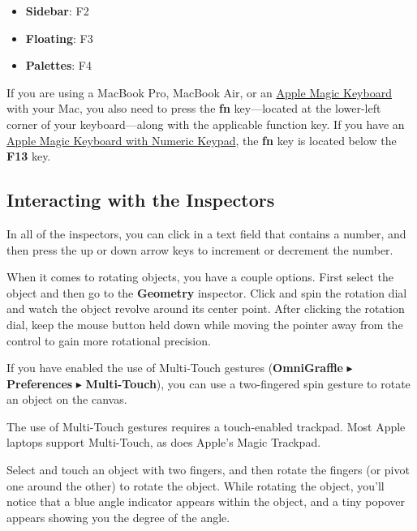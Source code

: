 \documentclass[../main.tex]{subfiles}
\begin{document}
\begin{itemize}
  \item \textbf{Sidebar}: F2
  \item \textbf{Floating}: F3
  \item \textbf{Palettes}: F4
\end{itemize}

\begin{ognote}
  If you are using a MacBook Pro, MacBook Air, or an
  \href{https://www.apple.com/shop/product/MLA22LL/A/magic-keyboard-us-english}{Apple Magic
  Keyboard} with your Mac, you also need to press the \textbf{fn} key---located at the
  lower-left corner of your keyboard---along with the applicable function key. If you have an
  \href{https://www.apple.com/shop/product/MQ052LL/A/magic-keyboard-with-numeric-keypad-us-english}{Apple
  Magic Keyboard with Numeric Keypad}, the \textbf{fn} key is located below the \textbf{F13}
  key.
\end{ognote}

\subsection{Interacting with the Inspectors}

In all of the inspectors, you can click in a text field that contains a number, and then press
the up or down arrow keys to increment or decrement the number.

When it comes to rotating objects, you have a couple options. First select the object and then
go to the \textbf{Geometry} inspector. Click and spin the rotation dial and watch the object
revolve around its center point. After clicking the rotation dial, keep the mouse button held
down while moving the pointer away from the control to gain more rotational precision.


If you have enabled the use of Multi-Touch gestures (\textbf{OmniGraffle} $\blacktriangleright$
\textbf{Preferences} $\blacktriangleright$ \textbf{Multi-Touch}), you can use a two-fingered
spin gesture to rotate an object on the canvas.

\begin{ognote}
  The use of Multi-Touch gestures requires a touch-enabled trackpad. Most Apple laptops support
  Multi-Touch, as does Apple's Magic Trackpad.
\end{ognote}

Select and touch an object with two fingers, and then rotate the fingers (or pivot one around
the other) to rotate the object. While rotating the object, you'll notice that a blue angle
indicator appears within the object, and a tiny popover appears showing you the degree of the
angle.
\end{document}
